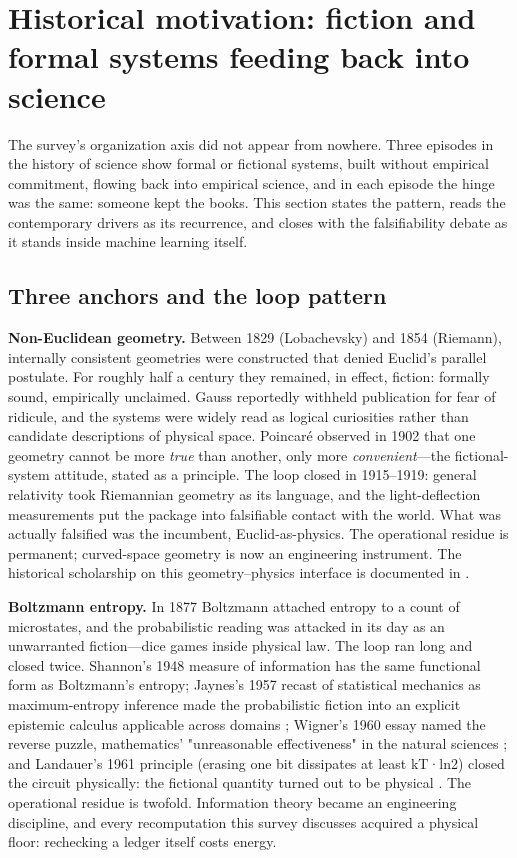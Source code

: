 \documentclass[11pt,a4paper]{article}
\begin{document}
\section{Historical motivation: fiction and formal systems feeding back into science}

The survey's organization axis did not appear from nowhere. Three episodes in the history of science show formal or fictional systems, built without empirical commitment, flowing back into empirical science, and in each episode the hinge was the same: someone kept the books. This section states the pattern, reads the contemporary drivers as its recurrence, and closes with the falsifiability debate as it stands inside machine learning itself.

\subsection{Three anchors and the loop pattern}

\textbf{Non-Euclidean geometry.} Between 1829 (Lobachevsky) and 1854 (Riemann), internally consistent geometries were constructed that denied Euclid's parallel postulate. For roughly half a century they remained, in effect, fiction: formally sound, empirically unclaimed. Gauss reportedly withheld publication for fear of ridicule, and the systems were widely read as logical curiosities rather than candidate descriptions of physical space. Poincaré observed in 1902 that one geometry cannot be more \textit{true} than another, only more \textit{convenient}—the fictional-system attitude, stated as a principle. The loop closed in 1915–1919: general relativity took Riemannian geometry as its language, and the light-deflection measurements put the package into falsifiable contact with the world. What was actually falsified was the incumbent, Euclid-as-physics. The operational residue is permanent; curved-space geometry is now an engineering instrument. The historical scholarship on this geometry–physics interface is documented in \cite{key18}.

\textbf{Boltzmann entropy.} In 1877 Boltzmann attached entropy to a count of microstates, and the probabilistic reading was attacked in its day as an unwarranted fiction—dice games inside physical law. The loop ran long and closed twice. Shannon's 1948 measure of information has the same functional form as Boltzmann's entropy; Jaynes's 1957 recast of statistical mechanics as maximum-entropy inference made the probabilistic fiction into an explicit epistemic calculus applicable across domains \cite{key19}; Wigner's 1960 essay named the reverse puzzle, mathematics' "unreasonable effectiveness" in the natural sciences \cite{key20}; and Landauer's 1961 principle (erasing one bit dissipates at least kT·ln2) closed the circuit physically: the fictional quantity turned out to be physical \cite{key21}. The operational residue is twofold. Information theory became an engineering discipline, and every recomputation this survey discusses acquired a physical floor: rechecking a ledger itself costs energy.
\end{document}
